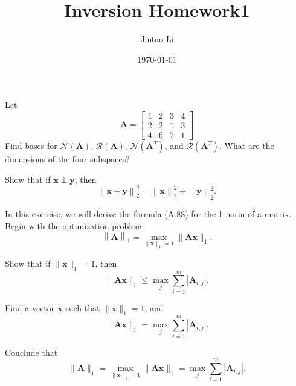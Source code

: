 \documentclass{myhw}
\title{Inversion Homework1}
\author{Jintao Li}
\date{\today}
\begin{document}
\maketitle
\newpage

\begin{homeworkProblem}
Let 
\begin{equation}
\mathbf{A} = 
\left[
\begin{matrix}
  1 & 2 & 3 & 4 \\
  2 & 2 & 1 & 3 \\
  4 & 6 & 7 & 1
\end{matrix}
\right]
\end{equation}
Find bases for $\mathcal{N}(\mathbf{A})$, $\mathcal{R}(\mathbf{A})$, $\mathcal{N}(\mathbf{A}^T)$, 
and $\mathcal{R}(\mathbf{A}^T)$. What are the dimensions of the four subspaces?

\end{homeworkProblem}

\begin{homeworkProblem}
Show that if $\mathbf{x} \perp \mathbf{y}$, then 
\begin{equation}
\left\| \mathbf{x} + \mathbf{y} \right\|^2_2 = 
\left\| \mathbf{x} \right\|^2_2 +
\left\| \mathbf{y} \right\|^2_2 .
\end{equation}
\end{homeworkProblem}

\begin{homeworkProblem}
In this exercise, we will derive the formula (A.88) for the 1-norm of a matrix.
Begin with the optimization problem 
\begin{equation}
\left\| \mathbf{A} \right\|_1 = 
\max_{\| \mathbf{x} \|_1 = 1} \| \mathbf{Ax}\|_1 .
\end{equation}

\begin{homeworkSection}
Show that if $\|\mathbf{x}\|_1 = 1$, then
\begin{equation}
\|\mathbf{Ax}\|_1 \leq 
\max_{j} \sum\limits_{i=1}^m \left| \mathbf{A}_{i, j} \right| .
\end{equation}
\end{homeworkSection}

\begin{homeworkSection}
Find a vector $\mathbf{x}$ such that $\|\mathbf{x}\|_1 = 1$, and 
\begin{equation}
\|\mathbf{Ax}\|_1 = \max_{j} \sum\limits_{i=1}^m \left| \mathbf{A}_{i, j} \right| .
\end{equation}
\end{homeworkSection}

\begin{homeworkSection}
Conclude that 
\begin{equation}
\|\mathbf{A}\|_1 = \max_{\|\mathbf{x}\|_1 = 1} \|\mathbf{Ax}\|_1 = 
\max_{j} \sum\limits_{i=1}^m \left| \mathbf{A}_{i, j} \right| .
\end{equation}
\end{homeworkSection}
\end{homeworkProblem}
\end{document}
